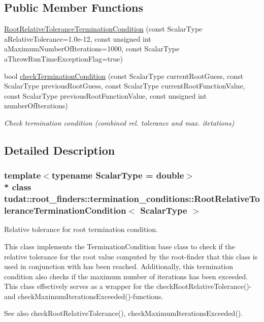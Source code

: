 \subsection*{Public Member Functions}
\begin{DoxyCompactItemize}
\item 
\hyperlink{classtudat_1_1root__finders_1_1termination__conditions_1_1RootRelativeToleranceTerminationCondition_add3dc8927d9f4206cecca0be7e651415}{Root\+Relative\+Tolerance\+Termination\+Condition} (const Scalar\+Type a\+Relative\+Tolerance=1.\+0e-\/12, const unsigned int a\+Maximum\+Number\+Of\+Iterations=1000, const Scalar\+Type a\+Throw\+Run\+Time\+Exception\+Flag=true)
\item 
bool \hyperlink{classtudat_1_1root__finders_1_1termination__conditions_1_1RootRelativeToleranceTerminationCondition_a494c7955513b7994a05eefb26d137123}{check\+Termination\+Condition} (const Scalar\+Type current\+Root\+Guess, const Scalar\+Type previous\+Root\+Guess, const Scalar\+Type current\+Root\+Function\+Value, const Scalar\+Type previous\+Root\+Function\+Value, const unsigned int number\+Of\+Iterations)
\begin{DoxyCompactList}\small\item\em Check termination condition (combined rel. tolerance and max. itetations) \end{DoxyCompactList}\end{DoxyCompactItemize}


\subsection{Detailed Description}
\subsubsection*{template$<$typename Scalar\+Type = double$>$\\*
class tudat\+::root\+\_\+finders\+::termination\+\_\+conditions\+::\+Root\+Relative\+Tolerance\+Termination\+Condition$<$ Scalar\+Type $>$}

Relative tolerance for root termination condition. 

This class implements the Termination\+Condition base class to check if the relative tolerance for the root value computed by the root-\/finder that this class is used in conjunction with has been reached. Additionally, this termination condition also checks if the maximum number of iterations has been exceeded. This class effectively serves as a wrapper for the check\+Root\+Relative\+Tolerance()-\/ and check\+Maximum\+Iterations\+Exceeded()-\/functions. \begin{DoxySeeAlso}{See also}
check\+Root\+Relative\+Tolerance(), check\+Maximum\+Iterations\+Exceeded(). 
\end{DoxySeeAlso}


